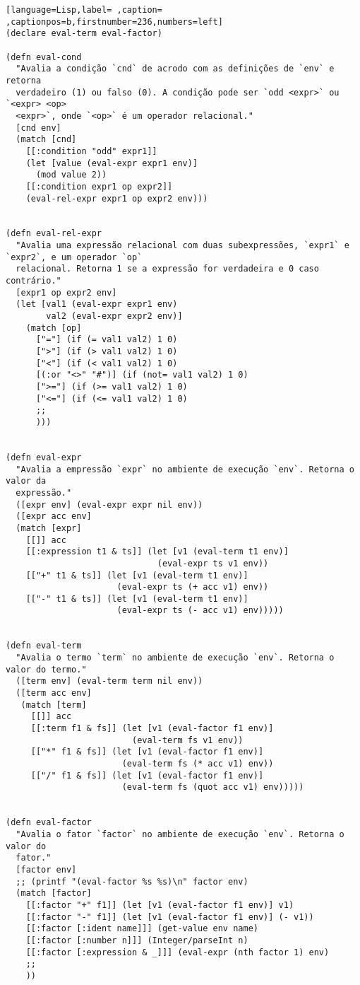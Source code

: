 \documentclass{scrartcl}
\begin{document}
\begin{lstlisting}[language=Lisp,label= ,caption= ,captionpos=b,firstnumber=236,numbers=left]
(declare eval-term eval-factor)

(defn eval-cond
  "Avalia a condição `cnd` de acrodo com as definições de `env` e retorna
  verdadeiro (1) ou falso (0). A condição pode ser `odd <expr>` ou `<expr> <op>
  <expr>`, onde `<op>` é um operador relacional."
  [cnd env]
  (match [cnd]
    [[:condition "odd" expr1]]
    (let [value (eval-expr expr1 env)]
      (mod value 2))
    [[:condition expr1 op expr2]]
    (eval-rel-expr expr1 op expr2 env)))


(defn eval-rel-expr
  "Avalia uma expressão relacional com duas subexpressões, `expr1` e `expr2`, e um operador `op`
  relacional. Retorna 1 se a expressão for verdadeira e 0 caso contrário."
  [expr1 op expr2 env]
  (let [val1 (eval-expr expr1 env)
        val2 (eval-expr expr2 env)]
    (match [op]
      ["="] (if (= val1 val2) 1 0)
      [">"] (if (> val1 val2) 1 0)
      ["<"] (if (< val1 val2) 1 0)
      [(:or "<>" "#")] (if (not= val1 val2) 1 0)
      [">="] (if (>= val1 val2) 1 0)
      ["<="] (if (<= val1 val2) 1 0)
      ;;
      )))


(defn eval-expr
  "Avalia a empressão `expr` no ambiente de execução `env`. Retorna o valor da
  expressão."
  ([expr env] (eval-expr expr nil env))
  ([expr acc env]
  (match [expr]
    [[]] acc
    [[:expression t1 & ts]] (let [v1 (eval-term t1 env)]
                              (eval-expr ts v1 env))
    [["+" t1 & ts]] (let [v1 (eval-term t1 env)]
                      (eval-expr ts (+ acc v1) env))
    [["-" t1 & ts]] (let [v1 (eval-term t1 env)]
                      (eval-expr ts (- acc v1) env)))))


(defn eval-term
  "Avalia o termo `term` no ambiente de execução `env`. Retorna o valor do termo."
  ([term env] (eval-term term nil env))
  ([term acc env]
   (match [term]
     [[]] acc
     [[:term f1 & fs]] (let [v1 (eval-factor f1 env)]
                         (eval-term fs v1 env))
     [["*" f1 & fs]] (let [v1 (eval-factor f1 env)]
                       (eval-term fs (* acc v1) env))
     [["/" f1 & fs]] (let [v1 (eval-factor f1 env)]
                       (eval-term fs (quot acc v1) env)))))


(defn eval-factor
  "Avalia o fator `factor` no ambiente de execução `env`. Retorna o valor do
  fator."
  [factor env]
  ;; (printf "(eval-factor %s %s)\n" factor env)
  (match [factor]
    [[:factor "+" f1]] (let [v1 (eval-factor f1 env)] v1)
    [[:factor "-" f1]] (let [v1 (eval-factor f1 env)] (- v1))
    [[:factor [:ident name]]] (get-value env name)
    [[:factor [:number n]]] (Integer/parseInt n)
    [[:factor [:expression & _]]] (eval-expr (nth factor 1) env)
    ;;
    ))
\end{lstlisting}
\end{document}
